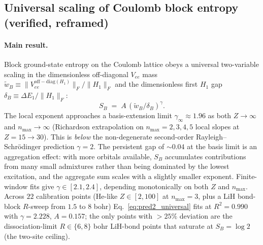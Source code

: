 \documentclass[twocolumn,pra,amsmath,amssymb,superscriptaddress]{revtex4-2}
\begin{document}
\subsection{Universal scaling of Coulomb block entropy
            (\textbf{verified, reframed})}
\label{sec:pred2}

\paragraph*{Main result.}  Block ground-state entropy on the
Coulomb lattice obeys a universal two-variable scaling in the
dimensionless off-diagonal $V_{ee}$ mass
$\tilde{w}_B \equiv \lVert V_{ee}^{\mathrm{off-diag}(H_1)}\rVert_F
/ \lVert H_1 \rVert_F$ and the dimensionless first $H_1$ gap
$\delta_B \equiv \Delta E_1 / \lVert H_1 \rVert_F$:
\begin{equation}
  S_B \;=\; A\,(\tilde{w}_B / \delta_B)^{\gamma}.
  \label{eq:pred2_universal}
\end{equation}
The local exponent approaches a basis-extension limit
$\gamma_{\infty} \approx 1.96$ as both $Z \to \infty$ and
$n_{\max}\to\infty$ (Richardson extrapolation on $n_{\max}=2,3,4,5$
local slopes at $Z=15\to 30$).  This is \emph{below} the
non-degenerate second-order Rayleigh--Schr\"odinger prediction
$\gamma=2$.  The persistent gap of $\sim 0.04$ at the basis
limit is an aggregation effect: with more orbitals available,
$S_B$ accumulates contributions from many small admixtures
rather than being dominated by the lowest excitation, and the
aggregate sum scales with a slightly smaller exponent.
Finite-window fits give $\gamma \in [2.1, 2.4]$, depending
monotonically on both $Z$ and $n_{\max}$.  Across $22$ calibration points
(He-like $Z\in[2,100]$ at $n_{\max}=3$, plus a LiH bond-block
$R$-sweep from $1.5$ to $8$ bohr) Eq.~\eqref{eq:pred2_universal}
fits at $R^{2}=0.990$ with $\gamma = 2.228$, $A = 0.157$; the
only points with $>25\%$ deviation are the dissociation-limit
$R\in\{6,8\}$ bohr LiH-bond points that saturate at
$S_B = \log 2$ (the two-site ceiling).
\end{document}

